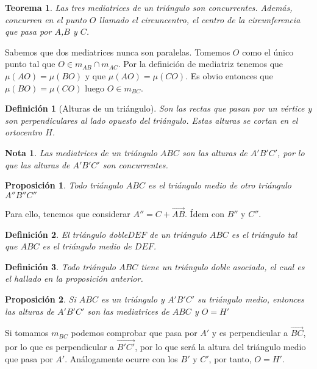 \documentclass[11pt, a4paper]{article}
\makeatletter
\newif\IfInSansMode
\let\oldsf\sffamily
\renewcommand*{\sffamily}{\oldsf\mathversion{sans}\InSansModetrue}
\let\oldnorm\normalfont
\renewcommand*{\normalfont}{\oldnorm\InSansModefalse\mathversion{normal}}
\renewenvironment{proof}[1][\proofname] {\vspace{-15pt}\par\pushQED{\qed}\normalfont\topsep6\p@\@plus6\p@\relax\trivlist\item[\hskip\labelsep\it#1\@addpunct{.}]\ignorespaces}{\popQED\endtrivlist\@endpefalse}
\renewcommand{\vec}{\overrightarrow}
\renewenvironment{proof}[1][\proofname] {\par\pushQED{\qed}\normalfont\topsep6\p@\@plus6\p@\relax\trivlist\item[\hskip\labelsep\itshape\sffamily#1\@addpunct{.}]\ignorespaces}{\popQED\endtrivlist\@endpefalse}
\theoremstyle{theorem-style}
\newtheorem{nth}{Teorema}[section]
\newtheorem{nprop}{Proposición}[section]
\theoremstyle{definition-style}
\newtheorem{ndef}{Definición}[section]
\theoremstyle{remark-style}
\newtheorem*{nota}{Nota}
\theoremstyle{example-style}
\makeatother
\begin{document}
\begin{nth}
  Las tres mediatrices de un triángulo son concurrentes. Además, concurren en el punto $O$ llamado el circuncentro, el centro de la circunferencia que pasa por $A$,$B$ y $C$.
\end{nth}
\begin{proof}
  Sabemos que dos mediatrices nunca son paralelas. Tomemos $O$ como el único punto tal que $O \in  m_{AB} \cap m_{AC}$. Por la definición de mediatriz tenemos que $\mu(AO) = \mu(BO)$ y que $\mu(AO) = \mu(CO)$. Es obvio entonces que $\mu(BO) = \mu(CO)$ luego $O \in m_{BC}$.
 
\end{proof}

\begin{ndef}[Alturas de un triángulo]
  Son las rectas que pasan por un vértice y son perpendiculares al lado opuesto del triángulo. Estas alturas se cortan en el ortocentro $H$.
\end{ndef}

\begin{nota}
  Las mediatrices de un triángulo $ABC$ son las alturas de $A'B'C'$, por lo que las alturas de $A'B'C'$ son concurrentes.
\end{nota}

\begin{nprop}
  Todo triángulo $ABC$ es el triángulo medio de otro triángulo $A''B''C''$
\end{nprop}
\begin{proof}
  Para ello, tenemos que considerar $A'' = C+ \vec{AB}$. Ídem con $B''$ y $C''$.
\end{proof}

\begin{ndef}
  El triángulo doble$DEF$ de un triángulo $ABC$ es el triángulo tal que $ABC$ es el triángulo medio de $DEF$.
\end{ndef}

\begin{ndef}
  Todo triángulo $ABC$ tiene un triángulo doble asociado, el cual es el hallado en la proposición anterior.
\end{ndef}


\begin{nprop}
  Si $ABC$ es un triángulo y $A'B'C'$ su triángulo medio, entonces las alturas de $A'B'C'$ son las mediatrices de $ABC$ y $O=H'$
\end{nprop}
\begin{proof}
  Si tomamos $m_{BC}$ podemos comprobar que pasa por $A'$ y es perpendicular a $\vec{BC}$, por lo que es perpendicular a $\vec{B'C'}$, por lo que será la altura del triángulo medio que pasa por $A'$. Análogamente ocurre con los $B'$ y $C'$, por tanto, $O=H'$.
\end{proof}
\end{document}
